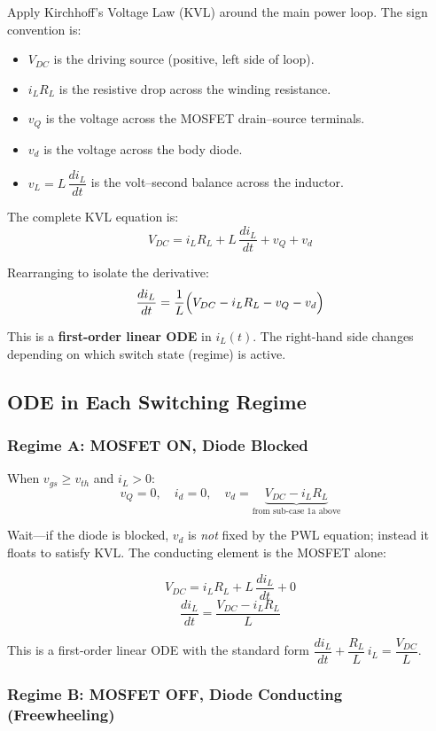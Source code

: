 \documentclass[11pt, a4paper]{article}
\begin{document}
Apply Kirchhoff's Voltage Law (KVL) around the main power loop. The sign convention is:
\begin{itemize}
    \item $V_{DC}$ is the driving source (positive, left side of loop).
    \item $i_L R_L$ is the resistive drop across the winding resistance.
    \item $v_Q$ is the voltage across the MOSFET drain–source terminals.
    \item $v_d$ is the voltage across the body diode.
    \item $v_L = L\,\dfrac{di_L}{dt}$ is the volt–second balance across the inductor.
\end{itemize}

The complete KVL equation is:
\[
    V_{DC} = i_L R_L + L\,\frac{di_L}{dt} + v_Q + v_d
\]

Rearranging to isolate the derivative:
\[
    \frac{di_L}{dt} = \frac{1}{L}\Bigl(V_{DC} - i_L R_L - v_Q - v_d\Bigr)
\]

This is a \textbf{first-order linear ODE} in $i_L(t)$. The right-hand side changes depending on which switch state (regime) is active.

\subsection{ODE in Each Switching Regime}

\subsubsection{Regime A: MOSFET ON, Diode Blocked}

When $v_{gs} \geq v_{th}$ and $i_L > 0$:
\[
    v_Q = 0, \quad i_d = 0, \quad v_d = \underbrace{V_{DC} - i_L R_L}_{\text{from sub-case 1a above}}
\]

Wait—if the diode is blocked, $v_d$ is \emph{not} fixed by the PWL equation; instead it floats to satisfy KVL. The conducting element is the MOSFET alone:

\[
    V_{DC} = i_L R_L + L\,\frac{di_L}{dt} + 0
\]
\[
    \boxed{\frac{di_L}{dt} = \frac{V_{DC} - i_L R_L}{L}}
\]

This is a first-order linear ODE with the standard form $\dfrac{di_L}{dt} + \dfrac{R_L}{L}\,i_L = \dfrac{V_{DC}}{L}$.

\subsubsection{Regime B: MOSFET OFF, Diode Conducting (Freewheeling)}
\end{document}
